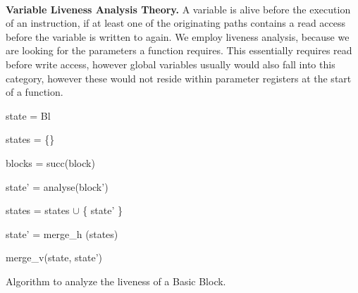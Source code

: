 ~\\
\textbf{Variable Liveness Analysis Theory.}
\label{subsection:livenessanalysis}
A variable is alive before the execution of an instruction, if at least one of the originating paths contains a read access before the variable is written to again. We employ 
liveness analysis, because we are looking for the  parameters a function requires. This essentially requires read before write access, however global variables usually
would also fall into this category, however these would not reside within parameter registers at the start of a function.
%
%
%
\begin{algorithm}[!h]
	\SetAlgoLined
	{
 	state = Bl
 	

	states = \{\}
	
	blocks = succ(block)
	
	 {
	
 		state' = analyse(block')
 		
		states = states $\cup$ \{ state' \}
	}

	state' = merge\_h (states)

	\Return merge\_v(state, state')

	}
\caption{Algorithm to analyze the liveness of a Basic Block.}
\label{alg:liveness}
\end{algorithm}
